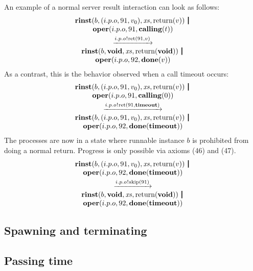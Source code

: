 \documentclass[twocolumn]{article}
\begin{document}
An example of a normal server result interaction can look as follows:
$$
\begin{array}{c}
	{\Trinst b {\Tclient {i.p.o} {91} {v_0}} \Xs {\Treturn v}} \,\Opar  \\
	{\Toper {i.p.o} {91} {\Tcalling t}} \vspace{0.6ex} \\
	\red{\say{i.p.o}{\Tret {91} v}} \\
	{\Trinst b \Tvoid \Xs {\Treturn \Tvoid}} \,\Opar \\
	{\Toper {i.p.o} {92} {\Tdone v}}
\end{array}
$$
As a contrast, this is the behavior observed when a call timeout occurs:
$$
\begin{array}{c}
	{\Trinst b {\Tclient {i.p.o} {91} {v_0}} \Xs {\Treturn v}} \,\Opar  \\
	{\Toper {i.p.o} {91} {\Tcalling 0}} \vspace{0.6ex} \\
	\red{\say{i.p.o}{\Tret {91} \Ttimeout}} \\
	{\Trinst b {\Tclient {i.p.o} {91} {v_0}} \Xs {\Treturn v}} \,\Opar  \\
	{\Toper {i.p.o} {92} {\Tdone \Ttimeout}}
\end{array}
$$
The processes are now in a state where runnable instance $b$ is prohibited from doing a normal return. Progress is only possible via axioms (46) and (47).
$$
\begin{array}{c}
	{\Trinst b {\Tclient {i.p.o} {91} {v_0}} \Xs {\Treturn v}} \,\Opar  \\
	{\Toper {i.p.o} {92} {\Tdone \Ttimeout}} \vspace{0.6ex} \\
	\red{\say{i.p.o}{\Tskip {91}}} \\
	{\Trinst b \Tvoid \Xs {\Treturn \Tvoid}} \,\Opar \\
	{\Toper {i.p.o} {92} {\Tdone \Ttimeout}}
\end{array}
$$


\subsection{Spawning and terminating} \label{sect:SpawnTerm}




\subsection{Passing time}
\end{document}
